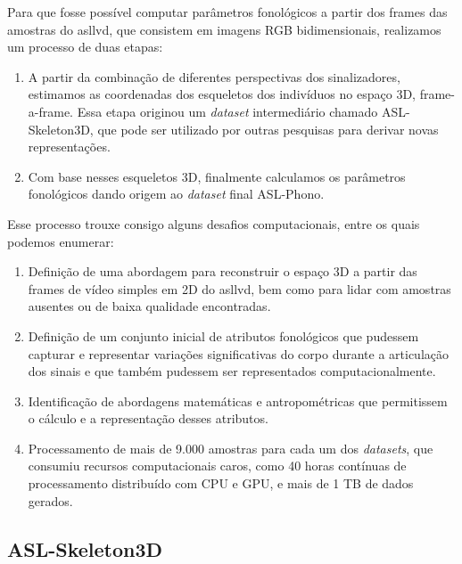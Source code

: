 Para que fosse possível computar parâmetros fonológicos a partir dos frames das amostras do \acrshort{asllvd}, que consistem em imagens RGB bidimensionais, realizamos um processo de duas etapas:

\begin{enumerate}
    \item A partir da combinação de diferentes perspectivas dos sinalizadores, estimamos as coordenadas dos esqueletos dos indivíduos no espaço 3D, frame-a-frame. Essa etapa originou um \textit{dataset} intermediário chamado ASL-Skeleton3D, que pode ser utilizado por outras pesquisas para derivar novas representações.
    \item Com base nesses esqueletos 3D, finalmente calculamos os parâmetros fonológicos dando origem ao \textit{dataset} final ASL-Phono.
\end{enumerate}


Esse processo trouxe consigo alguns desafios computacionais, entre os quais podemos enumerar:

\begin{enumerate}
    \item Definição de uma abordagem para reconstruir o espaço 3D a partir das frames de vídeo simples em 2D do \acrshort{asllvd}, bem como para lidar com amostras ausentes ou de baixa qualidade encontradas.

    \item Definição de um conjunto inicial de atributos fonológicos que pudessem capturar e representar variações significativas do corpo durante a articulação dos sinais e que também pudessem ser representados computacionalmente.
    
    \item Identificação de abordagens matemáticas e antropométricas que permitissem o cálculo e a representação desses atributos.
    
    \item Processamento de mais de 9.000 amostras para cada um dos \textit{datasets}, que consumiu recursos computacionais caros, como 40 horas contínuas de processamento distribuído com CPU e GPU, e mais de 1 TB de dados gerados.
\end{enumerate}



\subsection{ASL-Skeleton3D}
\label{sec:metodologia-datasets-3d}




